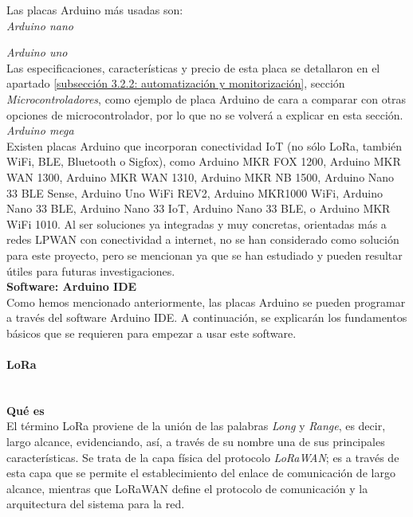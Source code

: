\documentclass[12pt]{article}
\newcommand{\subsubsubsection}[1]{\paragraph{#1}\mbox{}\\}
\begin{document}
	\noindent Las placas Arduino más usadas son: \\
	
	\noindent \textit{Arduino nano} \\
	
	\noindent
	
	\noindent \textit{Arduino uno} \\
	
	\noindent Las especificaciones, características y precio de esta placa se detallaron en el apartado \ref{subsección 3.2.2: automatización y monitorización}, sección \textit{Microcontroladores}, como ejemplo de placa Arduino de cara a comparar con otras opciones de microcontrolador, por lo que no se volverá a explicar en esta sección. \\
	
	\noindent \textit{Arduino mega} \\
	
	\noindent Existen placas Arduino que incorporan conectividad IoT (no sólo LoRa, también WiFi, BLE, Bluetooth o Sigfox), como Arduino MKR FOX 1200, Arduino MKR WAN 1300, Arduino MKR WAN 1310, Arduino MKR NB 1500, Arduino Nano 33 BLE Sense, Arduino Uno WiFi REV2, Arduino MKR1000 WiFi, Arduino Nano 33 BLE, Arduino Nano 33 IoT, Arduino Nano 33 BLE, o Arduino MKR WiFi 1010.  Al ser soluciones ya integradas y muy concretas, orientadas más a redes LPWAN con conectividad a internet, no se han considerado como solución para este proyecto, pero se mencionan ya que se han estudiado y pueden resultar útiles para futuras investigaciones.\\
	
	
	\noindent \textbf{Software: Arduino IDE} \\
	
	
	\noindent Como hemos mencionado anteriormente, las placas Arduino se pueden programar a través del software Arduino IDE. A continuación, se explicarán los fundamentos básicos que se requieren para empezar a usar este software. \\
	
	\subsubsubsection{LoRa}
	
	\noindent \textbf{Qué es}\\
	
	\noindent El término LoRa proviene de la unión de las palabras \textit{Long} y \textit{Range}, es decir, largo alcance, evidenciando, así, a través de su nombre una de sus principales características. Se trata de la capa física del protocolo \textit{LoRaWAN}; es a través de esta capa que se permite el establecimiento del enlace de comunicación de largo alcance, mientras que LoRaWAN define el protocolo de comunicación y la arquitectura del sistema para la red. \\
	
\end{document}
